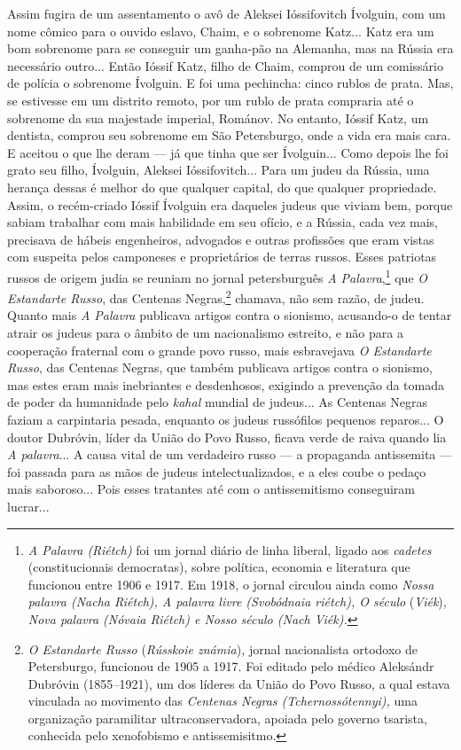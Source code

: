 Assim fugira de um assentamento o avô de Aleksei Ióssifovitch Ívolguin,
com um nome cômico para o ouvido eslavo, Chaim, e o sobrenome Katz...
Katz era um bom sobrenome para se conseguir um ganha-pão na Alemanha,
mas na Rússia era necessário outro... Então Ióssif Katz, filho de Chaim,
comprou de um comissário de polícia o sobrenome Ívolguin. E foi uma
pechincha: cinco rublos de prata. Mas, se estivesse em um distrito
remoto, por um rublo de prata compraria até o sobrenome da sua majestade
imperial, Románov. No entanto, Ióssif Katz, um dentista, comprou seu
sobrenome em São Petersburgo, onde a vida era mais cara. E aceitou o que
lhe deram --- já que tinha que ser Ívolguin... Como depois lhe foi grato
seu filho, Ívolguin, Aleksei Ióssifovitch... Para um judeu da Rússia,
uma herança dessas é melhor do que qualquer capital, do que qualquer
propriedade. Assim, o recém-criado Ióssif Ívolguin era daqueles judeus
que viviam bem, porque sabiam trabalhar com mais habilidade em seu
ofício, e a Rússia, cada vez mais, precisava de hábeis engenheiros,
advogados e outras profissões que eram vistas com suspeita pelos
camponeses e proprietários de terras russos. Esses patriotas russos de
origem judia se reuniam no jornal petersburguês \emph{A
Palavra},\footnote{\emph{A Palavra (Riétch)} foi um jornal diário de
  linha liberal, ligado aos \emph{cadetes} (constitucionais democratas),
  sobre política, economia e literatura que funcionou entre 1906 e 1917.
  Em 1918, o jornal circulou ainda como \emph{Nossa palavra (Nacha
  Riétch), A palavra livre (Svobódnaia riétch), O século} (\emph{Viék}),
  \emph{Nova palavra (Nóvaia Riétch) e Nosso século (Nach Viék).}} que
\emph{O Estandarte Russo}, das Centenas Negras,\footnote{\emph{O
  Estandarte Russo} (\emph{Rússkoie známia})\emph{,} jornal nacionalista
  ortodoxo de Petersburgo, funcionou de 1905 a 1917. Foi editado pelo
  médico Aleksándr Dubróvin (1855\emph{--}1921), um dos líderes da União
  do Povo Russo, a qual estava vinculada ao movimento das \emph{Centenas
  Negras (Tchernossótennyi),} uma organização paramilitar
  ultraconservadora, apoiada pelo governo tsarista, conhecida pelo
  xenofobismo e antissemisitmo.} chamava, não sem razão, de judeu.
Quanto mais \emph{A Palavra} publicava artigos contra o sionismo,
acusando-o de tentar atrair os judeus para o âmbito de um nacionalismo
estreito, e não para a cooperação fraternal com o grande povo russo,
mais esbravejava \emph{O Estandarte Russo}, das Centenas Negras, que
também publicava artigos contra o sionismo, mas estes eram mais
inebriantes e desdenhosos, exigindo a prevenção da tomada de poder da
humanidade pelo \emph{kahal} mundial de judeus... As Centenas Negras
faziam a carpintaria pesada, enquanto os judeus russófilos pequenos
reparos... O doutor Dubróvin, líder da União do Povo Russo, ficava verde
de raiva quando lia \emph{A palavra}... A causa vital de um verdadeiro
russo --- a propaganda antissemita --- foi passada para as mãos de
judeus intelectualizados, e a eles coube o pedaço mais saboroso... Pois
esses tratantes até com o antissemitismo conseguiram lucrar...

